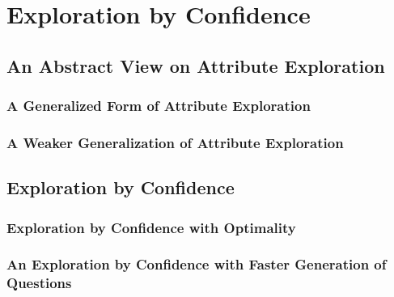
\chapter{Exploration by Confidence}
\label{cha:expl-conf}

\section{An Abstract View on Attribute Exploration}
\label{sec:an-abstract-view}

%
%

\subsection{A Generalized Form of Attribute Exploration}
\label{sec:gener-form-attr}


\subsection{A Weaker Generalization of Attribute Exploration}
\label{sec:weak-gener-attr}


\section{Exploration by Confidence}
\label{sec:expl-conf}


\subsection{Exploration by Confidence with Optimality}
\label{sec:expl-conf-1}


\subsection{An Exploration by Confidence with Faster Generation of Questions}
\label{sec:poss-fast-expl}


